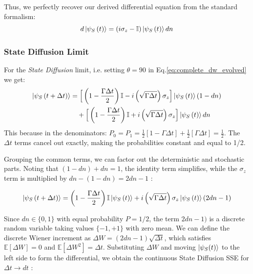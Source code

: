 \documentclass[a4paper,12pt]{article}
\begin{document}
Thus, we perfectly recover our derived differential equation from the standard formalism:
\begin{equation}
	d\ket{\psi_{S}\left(t\right)} = \left( i\sigma_{z} - \mathbb{I} \right) \ket{\psi_{S}\left(t\right)} dn
\end{equation}

\subsubsection{State Diffusion Limit}
For the \textit{State Diffusion} limit, i.e. setting $ \theta = 90 $ in Eq.\ref{eq:complete_dw_evolved} we get:
\begin{align}
	\ket{\psi_{S}\left(t + \Delta t \right)} &= 
	\Big[ \left(1 - \frac{\Gamma \Delta t}{2}\right) \mathbb{I} - i \left(\sqrt{\Gamma \Delta t}\right) \sigma_{z} \Big] \ket{\psi_{S}\left(t\right)} \left(1 - dn\right) \notag \\
	&\quad + \Big[ \left(1 - \frac{\Gamma \Delta t}{2}\right) \mathbb{I} + i \left(\sqrt{\Gamma \Delta t}\right) \sigma_{z} \Big] \ket{\psi_{S}\left(t\right)} dn
\end{align}
This because in the denominators:
$ P_0 = P_1 = \frac{1}{2}[1 - \Gamma\Delta t] + \frac{1}{2}[\Gamma\Delta t] = \frac{1}{2}$.
The $\Delta t$ terms cancel out exactly, making the probabilities constant and equal to 1/2.

Grouping the common terms, we can factor out the deterministic and stochastic parts.
Noting that $(1 - dn) + dn = 1 $, the identity term simplifies, while the $\sigma_z$ term
is multiplied by $dn - (1 - dn) = 2dn - 1$ :

\begin{equation}
	\ket{\psi_{S}\left(t + \Delta t \right)} = \left( 1 - \frac{\Gamma \Delta t}{2} \right) \mathbb{I} \ket{\psi_{S}\left(t\right)} + i \left(\sqrt{\Gamma \Delta t}\right) \sigma_{z} \ket{\psi_{S}\left(t\right)} (2dn - 1)
\end{equation}

Since $dn \in \{0, 1\}$ with equal probability $P = 1/2$, the term $2dn - 1)$ is a discrete 
random variable taking values $\{-1, +1\}$ with zero mean. We can define the discrete 
Wiener increment as $\Delta W = (2dn - 1)\sqrt{\Delta t}$, which satisfies $\mathbb{E}[\Delta W] = 0 $
and $\mathbb{E}[\Delta W^2] = \Delta t$.
Substituting $\Delta W$ and moving $\ket{\psi_{S}(t)}$ to the left side to form the differential, we obtain the continuous State Diffusion SSE for $\Delta t \rightarrow dt$ :
\end{document}
